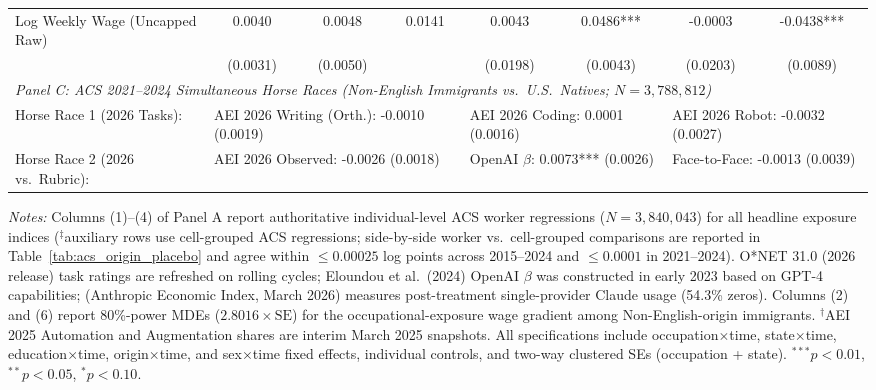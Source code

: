 \begin{table}[htbp]
{\begin{tabular}{lcccccccc}
Log Weekly Wage (Uncapped Raw) & 0.0040 & 0.0048 & 0.0141 & 0.0043 & 0.0486*** & -0.0003 & \multicolumn{2}{c}{-0.0438***} \\
 & (0.0031) & (0.0050) & & (0.0198) & (0.0043) & (0.0203) & \multicolumn{2}{c}{(0.0089)} \\
\midrule
\multicolumn{9}{l}{\textit{Panel C: ACS 2021--2024 Simultaneous Horse Races (Non-English Immigrants vs.\ U.S.\ Natives; $N = 3,788,812$)}} \\
\addlinespace[3pt]
Horse Race 1 (2026 Tasks): & \multicolumn{3}{l}{AEI 2026 Writing (Orth.): -0.0010 (0.0019)} & \multicolumn{2}{l}{AEI 2026 Coding: 0.0001 (0.0016)} & \multicolumn{3}{l}{AEI 2026 Robot: -0.0032 (0.0027)} \\
Horse Race 2 (2026 vs.\ Rubric): & \multicolumn{3}{l}{AEI 2026 Observed: -0.0026 (0.0018)} & \multicolumn{2}{l}{OpenAI $\beta$: 0.0073*** (0.0026)} & \multicolumn{3}{l}{Face-to-Face: -0.0013 (0.0039)} \\
\bottomrule
\end{tabular}%
}

\vspace{4pt}
\begin{minipage}{\textwidth}\scriptsize
\textit{Notes:} Columns (1)--(4) of Panel A report authoritative individual-level ACS worker regressions ($N = 3{,}840{,}043$) for all headline exposure indices ($^\ddagger$auxiliary rows use cell-grouped ACS regressions; side-by-side worker vs.\ cell-grouped comparisons are reported in Table~\ref{tab:acs_origin_placebo} and agree within $\le 0.00025$ log points across 2015--2024 and $\le 0.0001$ in 2021--2024). O*NET 31.0 (2026 release) task ratings are refreshed on rolling cycles; Eloundou et al.\ (2024) OpenAI $\beta$ was constructed in early 2023 based on GPT-4 capabilities; \citet{MassenkoffMcCrory2026} (Anthropic Economic Index, March 2026) measures post-treatment single-provider Claude usage (54.3\% zeros). Columns (2) and (6) report 80\%-power MDEs ($2.8016 \times \text{SE}$) for the occupational-exposure wage gradient among Non-English-origin immigrants. $^{\dagger}$AEI 2025 Automation and Augmentation shares \citep{Handa2025} are interim March 2025 snapshots. All specifications include occupation$\times$time, state$\times$time, education$\times$time, origin$\times$time, and sex$\times$time fixed effects, individual controls, and two-way clustered SEs (occupation + state). $^{***}p<0.01$, $^{**}p<0.05$, $^{*}p<0.10$.
\end{minipage}
\end{table}
